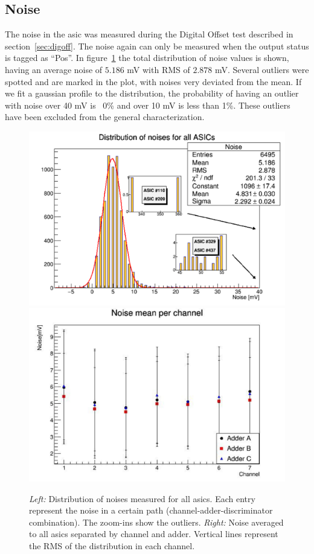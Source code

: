 \documentclass[main.tex]{subfiles}
\begin{document}
\subsection{Noise}

The noise in the \gls{asic} was measured during the Digital Offset test described in section~\ref{sec:digoff}. The noise again can only be measured when the output status is tagged as ``Pos''. In figure~\ref{fig:noisedist} the total distribution of noise values is shown, having an average noise of $5.186$ mV with RMS of $2.878$ mV. Several outliers were spotted and are marked in the plot, with noises very deviated from the mean. If we fit a gaussian profile to the distribution, the probability of having an outlier with noise over 40 mV is ~0\% and over 10 mV is less than 1\%. These outliers have been excluded
from the general characterization.
\begin{figure}[h]
  \centering
  \includegraphics[width=\textwidth]{./Pictures/noisedist.pdf}
  \endminipage
  \includegraphics[width=\textwidth]{./Pictures/noisech.pdf}
  \endminipage
  \caption{\textit{Left:} Distribution of noises measured for all \glspl{asic}. Each entry represent the noise in a certain path (channel-adder-discriminator combination). The zoom-ins show the outliers. \textit{Right:} Noise averaged to all \glspl{asic} separated by channel and adder. Vertical lines represent the RMS of the distribution in each channel.}
  \label{fig:noisedist}
\end{figure}
\end{document}
